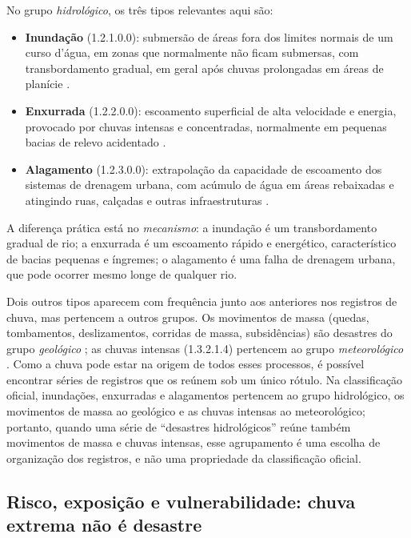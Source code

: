 No grupo \emph{hidrológico}, os três tipos relevantes aqui são:

\begin{itemize}
  \item \textbf{Inundação} (1.2.1.0.0): submersão de áreas fora dos limites normais de um curso d'água, em zonas que normalmente não ficam submersas, com transbordamento gradual, em geral após chuvas prolongadas em áreas de planície \cite{brasil2012cobrade}. 
  \item \textbf{Enxurrada} (1.2.2.0.0): escoamento superficial de alta velocidade e energia, provocado por chuvas intensas e concentradas, normalmente em pequenas bacias de relevo acidentado \cite{cemaden_protocolo2013}. 
  \item \textbf{Alagamento} (1.2.3.0.0): extrapolação da capacidade de escoamento dos sistemas de drenagem urbana, com acúmulo de água em áreas rebaixadas e atingindo ruas, calçadas e outras infraestruturas \cite{cemaden_protocolo2013}. 
\end{itemize}

A diferença prática está no \emph{mecanismo}: a inundação é um transbordamento gradual de rio; a enxurrada é um escoamento rápido e energético, característico de bacias pequenas e íngremes; o alagamento é uma falha de drenagem urbana, que pode ocorrer mesmo longe de qualquer rio.

Dois outros tipos aparecem com frequência junto aos anteriores nos registros de chuva, mas pertencem a outros grupos. Os movimentos de massa (quedas, tombamentos, deslizamentos, corridas de massa, subsidências) são desastres do grupo \emph{geológico} \cite{cemaden_protocolo2013}; as chuvas intensas (1.3.2.1.4) pertencem ao grupo \emph{meteorológico} \cite{cemaden_educacao}. Como a chuva pode estar na origem de todos esses processos, é possível encontrar séries de registros que os reúnem sob um único rótulo. Na classificação oficial, inundações, enxurradas e alagamentos pertencem ao grupo hidrológico, os movimentos de massa ao geológico e as chuvas intensas ao meteorológico; portanto, quando uma série de ``desastres hidrológicos'' reúne também movimentos de massa e chuvas intensas, esse agrupamento é uma escolha de organização dos registros, e não uma propriedade da classificação oficial. 

\subsection{Risco, exposição e vulnerabilidade: chuva extrema não é desastre}
\label{subsec:risco}


